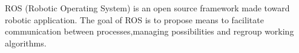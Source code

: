 ROS (Robotic Operating System) is an open source framework made toward robotic application.
The goal of ROS is to propose means to facilitate communication between processes,managing possibilities
and regroup working algorithms.
